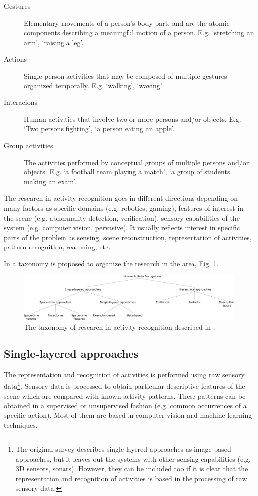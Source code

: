 \documentclass[a4paper, 12pt, openany, oneside]{book}
\begin{document}
\begin{description}
\item[Gestures] Elementary movements of a person's body part, and are the atomic components describing a meaningful motion of a person. 
E.g. `stretching an arm', `raising a leg'.
\item[Actions] Single person activities that may be composed of multiple gestures organized temporally. 
E.g. `walking', `waving'.
\item[Interacions] Human activities that involve two or more persons and/or objects. 
E.g. `Two persons fighting', `a person eating an apple'.
\item[Group activities] The activities performed by conceptual groups of multiple persons and/or objects. 
E.g. `a football team playing a match', `a group of students making an exam'.
\end{description}

The research in activity recognition goes in different directions depending on many factors as specific domains (e.g. robotics, gaming), features of interest in the scene (e.g. abnormality detection, verification), sensory capabilities of the system (e.g. computer vision, pervasive). It usually reflects interest in specific parts of the problem as sensing, scene reconstruction, representation of activities, pattern recognition, reasoning, etc.

In \citep{Aggarwal11_HumanActivity} a taxonomy is proposed to organize the research in the area, Fig. \ref{fig:taxonomy}.  

\begin{figure}[h]
\centering
\includegraphics[width=\textwidth]{fig/img_Aggarwal_Taxonomy.pdf}
\caption{The taxonomy of research in activity recognition described in \cite{Aggarwal11_HumanActivity}.}
\label{fig:taxonomy}
\end{figure}

\subsection{Single-layered approaches}
The representation and recognition of activities is performed using raw sensory data\footnote{The original survey \citep{Aggarwal11_HumanActivity} describes single layered approaches as image-based approaches, but it leaves out the systems with other sensing capabilities (e.g. 3D sensors, sonars). 
However, they can be included too if it is clear that the representation and recognition of activities is based in the processing of raw sensory data.}. 
Sensory data is processed to obtain particular descriptive features of the scene which are compared with known activity patterns. 
These patterns can be obtained in a supervised or unsupervised fashion (e.g. common occurrences of a specific action). 
Most of them are based in computer vision and machine learning techniques.
\end{document}
